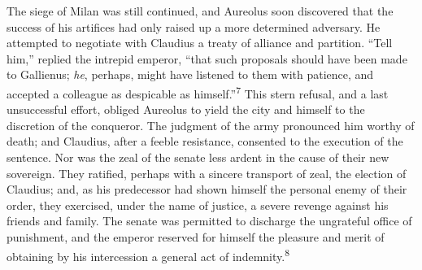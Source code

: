



The siege of Milan was still continued, and Aureolus soon
discovered that the success of his artifices had only raised up a
more determined adversary. He attempted to negotiate with
Claudius a treaty of alliance and partition. “Tell him,” replied
the intrepid emperor, “that such proposals should have been made
to Gallienus; \textit{he}, perhaps, might have listened to them with
patience, and accepted a colleague as despicable as himself.”\textsuperscript{7}
This stern refusal, and a last unsuccessful effort, obliged
Aureolus to yield the city and himself to the discretion of the
conqueror. The judgment of the army pronounced him worthy of
death; and Claudius, after a feeble resistance, consented to the
execution of the sentence. Nor was the zeal of the senate less
ardent in the cause of their new sovereign. They ratified,
perhaps with a sincere transport of zeal, the election of
Claudius; and, as his predecessor had shown himself the personal
enemy of their order, they exercised, under the name of justice,
a severe revenge against his friends and family. The senate was
permitted to discharge the ungrateful office of punishment, and
the emperor reserved for himself the pleasure and merit of
obtaining by his intercession a general act of indemnity.\textsuperscript{8}



